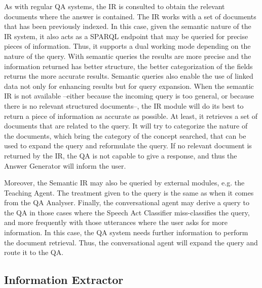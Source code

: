 As with regular \ac{QA} systems, the \ac{IR} is consulted to obtain the relevant documents where the answer is contained. The \ac{IR} works with a set of documents that has been previously indexed.
In this case, given the semantic nature of the \ac{IR} system, it also acts as a SPARQL endpoint that may be queried for precise pieces of information. Thus, it supports a dual working mode depending on the nature of the query. 
With semantic queries the results are more precise and the information returned has better structure, the better categorization of the fields returns the more accurate results. 
Semantic queries also enable the use of linked data not only for enhancing results but for query expansion.
When the semantic \ac{IR} is not available --either because the incoming query is too general, or because there is no relevant structured documents--, the \ac{IR} module will do its best to return a piece of information as accurate as possible. At least, it retrieves a set of documents that are related to the query. It will try to categorize the nature of the documents, which bring the category of the concept searched, that can be used to expand the query and reformulate the query.
If no relevant document is returned by the \ac{IR}, the \ac{QA} is not capable to give a response, and thus the Answer Generator will inform the user. 

Moreover, the Semantic \ac{IR} may also be queried by external modules, e.g. the Teaching Agent. The treatment given to the query is the same as when it comes from the QA Analyser.
Finally, the conversational agent may derive a query to the \ac{QA} in those cases where the Speech Act Classifier miss-classifies the query, and more frequently with those utterances where the user	 asks for more information. In this case, the \ac{QA} system needs further information to perform the document retrieval. Thus, the conversational agent will expand the query and route it to the \ac{QA}.


\subsection{Information Extractor}

